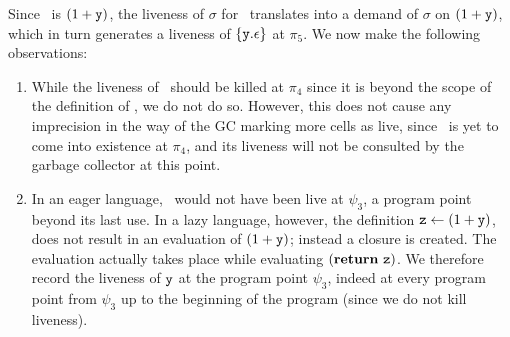 \documentclass[9pt]{sigplanconf}
\begin{document}





Since   \pz\  is   $(1  +   \mbox{\tt y})$,  the   liveness  of   $\sigma$  for
\pz\ translates into a demand  of $\sigma$ on $(1+\mbox{\tt y})$, which in turn
generates a  liveness of $\{\mbox{\tt y}.\epsilon\}$ at  $\pi_5$.  We now make
the following observations:
\begin{enumerate}
\item While the liveness of \py\  should be killed at $\pi_4$ since it
  is  beyond the scope  of the  definition of  \py, we  do not  do so.
  However, this  does not cause any  imprecision in the way  of the GC
  marking more cells as live, since \py\ is yet to come into existence
  at $\pi_4$,  and its liveness will  not be consulted  by the garbage
  collector at  this point. 
\item In an eager language, \py\ would not have been live at $\psi_3$,
  a program point  beyond its last use.  In  a lazy language, however,
  the  definition $\mbox{\tt z}  \leftarrow  (1+\mbox{\tt y})$, does  not  result in  an
  evaluation  of  $(1+\mbox{\tt y})$;  instead   a  closure  is  created.   The
  evaluation  actually takes  place while  evaluating $(\mbox{$\mathbf{ return}$}~\mbox{\tt z})$.
  We therefore  record  the liveness of $\mbox{\tt y}$ at the program  
  point $\psi_3$,  indeed at every  program point from $\psi_3$  up to
  the beginning  of the program (since  we do not  kill liveness).
\end{enumerate}
\end{document}
